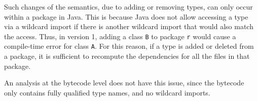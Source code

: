 {Such changes of the semantics, due to adding or removing types, can only occur
within a package in Java. This is because Java does not allow accessing a type
via a wildcard import if there is another wildcard import that would also match
the access.
Thus, in version 1, adding a class \texttt{B} to package \texttt{r} would cause a
compile-time error for class \texttt{A}.
For this reason, if a type is added or deleted from a package, it is sufficient to recompute the dependencies for all the files in that package.

An analysis at the bytecode level does not have this issue, since the bytecode only contains fully qualified type names, and no wildcard imports.

\begin{figure}
  \centering
\begin{adjustbox}{max width=\linewidth}
\end{adjustbox}
\end{figure}}
